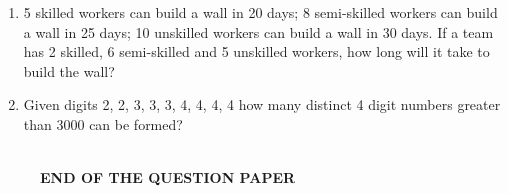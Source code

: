 \documentclass[journal,12pt,onecolumn]{IEEEtran}
\theoremstyle{remark}
\begin{document}
\begin{enumerate}
\begin{enumerate}  \end{enumerate}

\item 5 skilled workers can build a wall in 20 days; 8 semi-skilled workers can build a wall in 25 days; 10 unskilled workers can build a wall in 30 days. If a team has 2 skilled, 6 semi-skilled and 5 unskilled workers, how long will it take to build the wall?\hfill{}

\begin{enumerate}  \end{enumerate}

\item Given digits 2, 2, 3, 3, 3, 4, 4, 4, 4 how many distinct 4 digit numbers greater than 3000 can be formed?\hfill{}

\begin{enumerate}  \end{enumerate}
\end{enumerate}

\begin{figure}[H] \centering
	\hrulefill\\
	\textbf{END OF THE QUESTION PAPER}
\end{figure}
\end{document}
